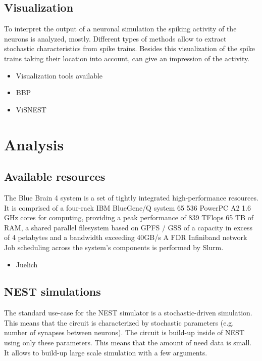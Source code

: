 \documentclass[a4paper]{article}
\begin{document}
\subsection{Visualization}
To interpret the output of a neuronal simulation the spiking activity of the neurons is analyzed, mostly. 
Different types of methods allow to extract stochastic characteristics from spike trains.
Besides this visualization of the spike trains taking their location into account,
can give an impression of the activity.

\begin{itemize}
      \item Visualization tools available
      \item BBP
      \item ViSNEST
\end{itemize}


\section{Analysis}

\subsection{Available resources}   
The Blue Brain 4 system is a set of tightly integrated high-performance resources. It is comprised of a four-rack IBM BlueGene/Q system 65 536 PowerPC A2 1.6 GHz cores for computing, providing a peak performance of 839 TFlops 65 TB of RAM, a shared parallel filesystem based on GPFS / GSS of a capacity in excess of 4 petabytes and a bandwidth exceeding 40GB/s A FDR Infiniband network Job scheduling across the system's components is performed by Slurm. 

\begin{itemize}
      \item Juelich
\end{itemize}


\subsection{NEST simulations}
The standard use-case for the NEST simulator is a stochastic-driven simulation. This means
that the circuit is characterized by stochastic parameters (e.g. number of synapses between neurons).
The circuit is build-up inside of NEST using only these parameters.
This means that the amount of need data is small. It allows to build-up large scale simulation
with a few arguments.
\end{document}
